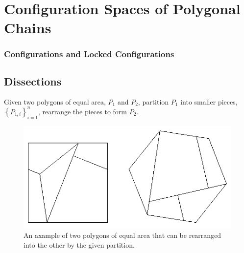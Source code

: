 \section{Configuration Spaces of Polygonal Chains}
\subsubsection{Configurations and Locked Configurations}
\subsection{Dissections}
\begin{prob}\label{def:dissection}
Given two polygons of equal area, $P_1$ and $P_2$, partition $P_1$ into smaller
pieces,$\left\lbrace P_{1,i}\right\rbrace_{i=1}^n $, rearrange the pieces to
form $P_2$. \cite{frederickson1997dissections}
\end{prob}
\begin{figure}[h]
\begin{center}
\includegraphics[scale=1]{../graphics/polygonaldissection.png}
\caption{An axample of two polygons of equal area that can be rearranged into
the other by the given partition.\cite{davidEppstienJunkyard}}
\label{fig:polygonaldissection}
\end{center}
\end{figure}